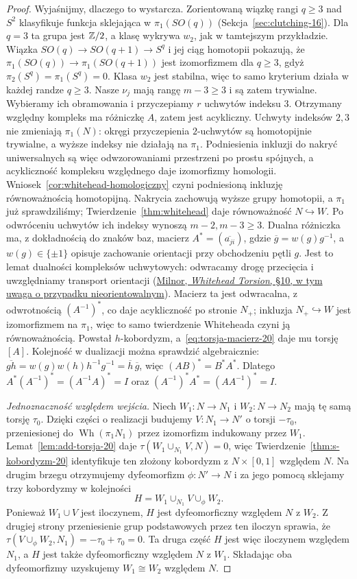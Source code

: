 \begin{proof}
Wyjaśnijmy, dlaczego to wystarcza. Zorientowaną wiązkę rangi
$q\geq3$ nad $S^2$ klasyfikuje funkcja sklejająca w
$\pi_1(SO(q))$ (Sekcja~\ref{sec:clutching-16}).
Dla $q=3$ ta grupa jest $\mathbb{Z}/2$, a klasę wykrywa $w_2$,
jak w tamtejszym przykładzie. Wiązka
$SO(q)\to SO(q+1)\to S^q$ i jej ciąg homotopii pokazują,
że $\pi_1(SO(q))\to\pi_1(SO(q+1))$ jest izomorfizmem
dla $q\geq3$, gdyż $\pi_2(S^q)=\pi_1(S^q)=0$.
Klasa $w_2$ jest stabilna, więc to samo kryterium działa
w każdej randze $q\geq3$.
Nasze $\nu_j$ mają rangę $m-3\geq3$ i są zatem trywialne.
Wybieramy ich obramowania i przyczepiamy $r$ uchwytów indeksu $3$.
Otrzymany względny kompleks ma różniczkę $A$,
zatem jest acykliczny.
Uchwyty indeksów $2,3$ nie zmieniają
$\pi_1(N)$: okręgi przyczepienia $2$-uchwytów
są homotopijnie trywialne, a wyższe indeksy
nie działają na $\pi_1$. Podniesienia inkluzji do nakryć
uniwersalnych są więc odwzorowaniami przestrzeni po prostu
spójnych, a acykliczność kompleksu względnego daje izomorfizmy
homologii. Wniosek~\ref{cor:whitehead-homologiczny}
czyni podniesioną inkluzję równoważnością homotopijną.
Nakrycia zachowują wyższe grupy homotopii, a $\pi_1$ już
sprawdziliśmy; Twierdzenie~\ref{thm:whitehead} daje równoważność
$N\hookrightarrow W$. Po odwróceniu uchwytów
ich indeksy wynoszą $m-2,m-3\geq3$.
Dualna różniczka ma, z dokładnością do znaków baz,
macierz $A^*=(\overline{a_{ji}})$, gdzie
$\overline g=w(g)g^{-1}$, a $w(g)\in\{\pm1\}$ opisuje
zachowanie orientacji przy obchodzeniu pętli $g$.
Jest to lemat dualności kompleksów uchwytowych:
odwracamy drogę przecięcia i uwzględniamy transport
orientacji (\href{https://webhomes.maths.ed.ac.uk/~v1ranick/papers/milnorwh.pdf}
{Milnor, \emph{Whitehead Torsion}, \S10, w tym uwaga
o przypadku nieorientowalnym}). Macierz ta jest odwracalna,
z odwrotnością $(A^{-1})^*$, co daje
acykliczność po stronie $N_+$; inkluzja
$N_+\hookrightarrow W$ jest izomorfizmem
na $\pi_1$, więc to samo twierdzenie Whiteheada
czyni ją równoważnością. Powstał
$h$-kobordyzm, a~\eqref{eq:torsja-macierz-20}
daje mu torsję $[A]$.
Kolejność w dualizacji można sprawdzić algebraicznie:
$\overline{gh}=w(g)w(h)h^{-1}g^{-1}=\overline h\,\overline g$,
więc $(AB)^*=B^*A^*$.
Dlatego $A^*(A^{-1})^*=(A^{-1}A)^*=I$
oraz $(A^{-1})^*A^*=(AA^{-1})^*=I$.

\emph{Jednoznaczność względem wejścia.}
Niech $W_1:N\to N_1$ i $W_2:N\to N_2$ mają tę
samą torsję $\tau_0$. Dzięki części o realizacji
budujemy $V:N_1\to N'$ o torsji $-\tau_0$,
przeniesionej do $\operatorname{Wh}(\pi_1N_1)$
przez izomorfizm indukowany przez $W_1$.
Lemat~\ref{lem:add-torsja-20} daje
$\tau(W_1\cup_{N_1}V,N)=0$, więc
Twierdzenie~\ref{thm:s-kobordyzm-20}
identyfikuje ten złożony kobordyzm z
$N\times[0,1]$ względem $N$.
Na drugim brzegu otrzymujemy dyfeomorfizm
$\phi:N'\to N$ i za jego pomocą sklejamy
trzy kobordyzmy w kolejności
\[
 H=W_1\cup_{N_1}V\cup_\phi W_2.
\]
Ponieważ $W_1\cup V$ jest iloczynem,
$H$ jest dyfeomorficzny względem $N$
z $W_2$. Z drugiej strony przeniesienie
grup podstawowych przez ten iloczyn
sprawia, że $\tau(V\cup_\phi W_2,N_1)
=-\tau_0+\tau_0=0$.
Ta druga część $H$ jest więc iloczynem
względem $N_1$, a $H$ jest także
dyfeomorficzny względem $N$ z $W_1$.
Składając oba dyfeomorfizmy uzyskujemy
$W_1\cong W_2$ względem $N$.
\end{proof}

